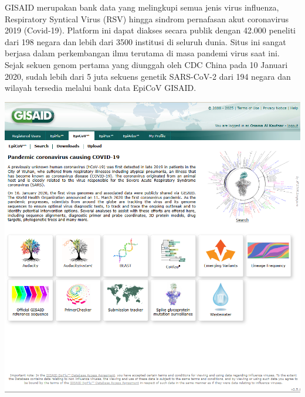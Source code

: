 \documentclass{article}
\begin{document}
\begin{flushleft}
\begin{enumerate}
            GISAID merupakan bank data yang melingkupi semua jenis virus influenza,
            Respiratory Syntical Virus (RSV) hingga sindrom pernafasan akut coronavirus 2019
            (Covid-19). Platform ini dapat diakses secara publik dengan 42.000 peneliti dari 198
            negara dan lebih dari 3500 institusi di seluruh dunia. Situs ini sangat berjasa dalam
            perkembangan ilmu terutama di masa pandemi virus saat ini. Sejak sekuen genom
            pertama yang diunggah oleh CDC China pada 10 Januari 2020, sudah lebih dari 5
            juta sekuens genetik SARS-CoV-2 dari 194 negara dan wilayah tersedia melalui
            bank data EpiCoV GISAID.
            \par\vspace{0.5cm}
            \includegraphics[scale=0.4]{Modul1/img/7.png}


\end{enumerate}
\end{flushleft}
\end{document}
